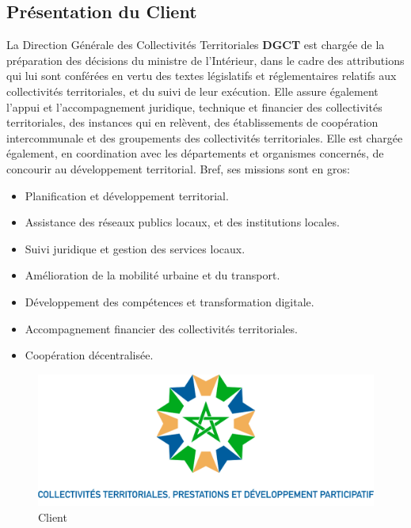 \documentclass[a4paper]{report}
\begin{document}
\begin{doublespace}
    \section{Présentation du Client}
    La Direction Générale des Collectivités Territoriales \textbf{DGCT} est chargée de la préparation des décisions du ministre de l’Intérieur,
    dans le cadre des attributions qui lui sont conférées en vertu des textes législatifs et réglementaires relatifs aux collectivités
    territoriales, et du suivi de leur exécution. Elle assure également l’appui et l'accompagnement juridique, technique et financier
    des collectivités territoriales, des instances qui en relèvent, des établissements de coopération intercommunale et des groupements
    des collectivités territoriales. Elle est chargée également, en coordination avec les départements et organismes concernés, de
    concourir au développement territorial. Bref, ses missions sont en gros:
    \begin{itemize}
        \item Planification et développement territorial.
        \item Assistance des réseaux publics locaux, et des institutions locales.
        \item Suivi juridique et gestion des services locaux.
        \item Amélioration de la mobilité urbaine et du transport.
        \item Développement des compétences et transformation digitale.
        \item Accompagnement financier des collectivités territoriales.
        \item Coopération décentralisée.
    \end{itemize}
    \begin{figure}[H]
        \begin{center}
            \includegraphics[scale=0.27]{images/logo-fr.png}
            \caption{Client}
        \end{center}
    \end{figure}
    \newpage

\end{doublespace}
\end{document}
